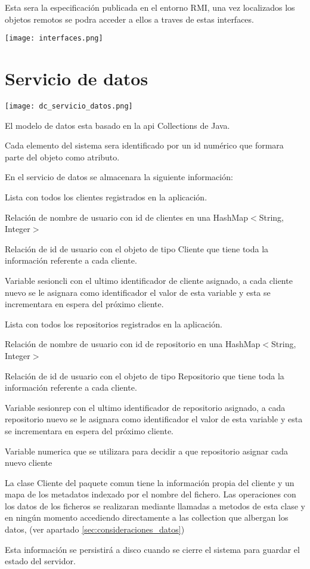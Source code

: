 Esta sera la especificación publicada en el entorno RMI, una vez localizados los objetos remotos se podra acceder a ellos a traves de estas interfaces.

\texttt{[image: interfaces.png]}

\section{Servicio de datos}
\texttt{[image: dc\_servicio\_datos.png]}

El modelo de datos esta basado en la api Collections de Java.

Cada elemento del sistema sera identificado por un id numérico que formara parte del objeto como atributo.

En el servicio de datos se almacenara la siguiente información:
\begin{compactitem}
\item Lista con todos los clientes registrados en la aplicación.
\item Relación de nombre de usuario con id de clientes en una HashMap$<$String, Integer$>$
\item Relación de id de usuario con el objeto de tipo Cliente que tiene toda la información referente a cada cliente.
\item Variable sesioncli con el ultimo identificador de cliente asignado, a cada cliente nuevo se le asignara como identificador el valor de esta variable y esta se incrementara en espera del próximo cliente.
\item Lista con todos los repositorios registrados en la aplicación.
\item Relación de nombre de usuario con id de repositorio en una HashMap$<$String, Integer$>$
\item Relación de id de usuario con el objeto de tipo Repositorio que tiene toda la información referente a cada cliente.
\item Variable sesionrep con el ultimo identificador de repositorio asignado, a cada repositorio nuevo se le asignara como identificador el valor de esta variable y esta se incrementara en espera del próximo cliente.
\item Variable numerica que se utilizara para decidir a que repositorio asignar cada nuevo cliente
\end{compactitem}

La clase Cliente del paquete comun tiene la información propia del cliente y un mapa de los metadatos indexado por el nombre del fichero. Las operaciones con los datos de los ficheros se realizaran mediante llamadas a metodos de esta clase y en ningún momento accediendo directamente a las collection que albergan los datos, (ver apartado \ref{sec:consideraciones_datos})

Esta información se persistirá a disco cuando se cierre el sistema para guardar el estado del servidor.




